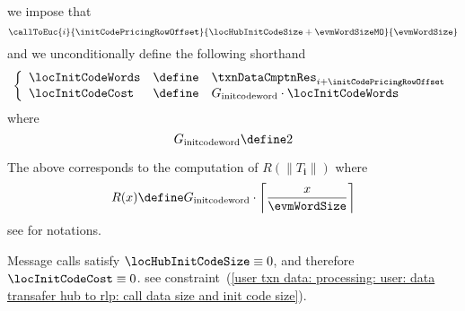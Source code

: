 \item[\underline{\underline{Row n$°(i + \initCodePricingRowOffset)$: \cite{EIP-3860} mandated init code pricing:}}]
	we impose that
	\[
		\callToEuc
		{i}{\initCodePricingRowOffset}
		{\locHubInitCodeSize + \evmWordSizeMO}
		{\evmWordSize}
	\]
	and we unconditionally define the following shorthand
	\[
		\left\{ \begin{array}{lcl}
			\locInitCodeWords & \define & \txnDataCmptnRes _{i + \initCodePricingRowOffset}           \\
			\locInitCodeCost  & \define & G_{\text{initcodeword}} \cdot \locInitCodeWords \\
		\end{array} \right.
	\]
	where
	\[
		G_{\text{initcodeword}} \define 2
	\]

	\saNote{}
	The above corresponds to the computation of $R(\| T _ \textbf{i} \|)$ where
	\[
		R(x) \define G_{\text{initcodeword}} \cdot \left\lceil \frac{x}{\evmWordSize} \right\rceil
	\]
	see \cite{EYP-Shanghai} for notations.

	\saNote{} \label{user txn data: processing: user: common computations: init code cost vanishes for message calls}
	Message calls satisfy $\locHubInitCodeSize \equiv 0$, and therefore $\locInitCodeCost \equiv 0$.
	see constraint~(\ref{user txn data: processing: user: data transafer hub to rlp: call data size and init code size}).
